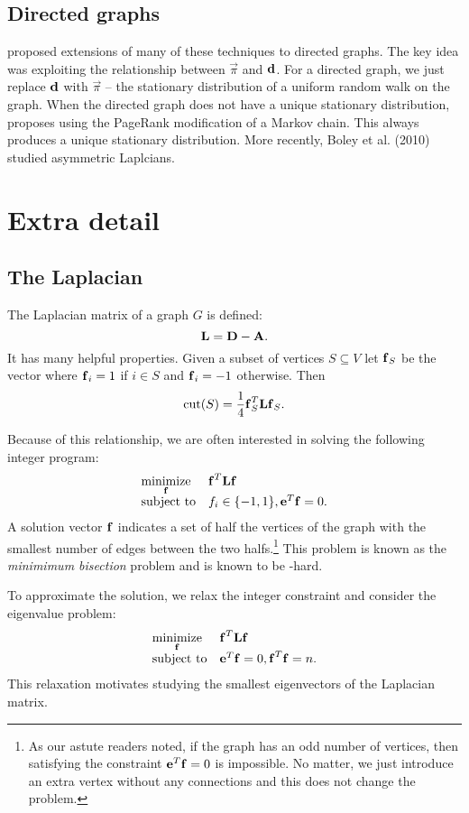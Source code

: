 \documentclass[nofonts]{dgleich-article}
\DeclareMathOperator{\cut}{cut}
\renewcommand{\vpi}{\vec{\pi}}
\begin{document}
\subsection{Directed graphs}

\citet{Chung2005-directed-laplacian} proposed extensions of many of these 
techniques to directed graphs.  
The key idea was exploiting the relationship between $\vpi$ and $\boldsymbol{\mathrm{d}}$.
For a directed graph, we just replace $\boldsymbol{\mathrm{d}}$ with $\vpi$ -- the stationary 
distribution of a uniform random walk on the graph.
When the directed graph does not have a unique stationary distribution,
\citet{zhou2005-directed-learning} proposes using the PageRank
modification of a Markov chain.  This always produces a unique stationary
distribution.  More recently, Boley et al. (2010)
studied asymmetric Laplcians.  

\section{Extra detail}

\subsection{The Laplacian}

The Laplacian matrix of a graph $G$ is defined:
\[ \boldsymbol{\mathrm{L}} = \boldsymbol{\mathrm{D}} - \boldsymbol{\mathrm{A}}. \]
It has many helpful properties.  Given a subset of vertices $S \subseteq V$
let  $\boldsymbol{\mathrm{f}}_S$ be the vector where $\boldsymbol{\mathrm{f}}_i = 1$ if $i \in S$ and $\boldsymbol{\mathrm{f}}_i = -1$
otherwise.  Then 
\[ \cut(S) = \frac{1}{4} \vf_S^T \mL \vf_S. \]


Because of this relationship, we are often interested in solving the following
integer program:
\[ \begin{array}{ll} {\displaystyle \operatorname*{minimize}_{\ensuremath{\boldsymbol{\mathrm{f}}}}} & \boldsymbol{\mathrm{f}}^T \boldsymbol{\mathrm{L}} \boldsymbol{\mathrm{f}} \\ \text{subject to} & f_i \in \{-1, 1\}, \boldsymbol{\mathrm{e}}^T \boldsymbol{\mathrm{f}} = 0.  \end{array}  \]
A solution vector $\boldsymbol{\mathrm{f}}$ indicates a set of half the vertices of the
graph with the smallest number of edges between the two halfs.\footnote{
As our astute readers noted, if the graph has an odd number of vertices,
then satisfying the constraint $\boldsymbol{\mathrm{e}}^T \boldsymbol{\mathrm{f}} = 0$ is impossible.  No matter,
we just introduce an extra vertex without any connections and this does not 
change the problem.}  This problem is known as the \emph{minimimum bisection}
problem and is known to be -hard.

To approximate the solution, we relax the integer constraint and consider
the eigenvalue problem: 
\[ \begin{array}{ll} {\displaystyle \operatorname*{minimize}_{\ensuremath{\boldsymbol{\mathrm{f}}}}} & \boldsymbol{\mathrm{f}}^T \boldsymbol{\mathrm{L}} \boldsymbol{\mathrm{f}} \\ \text{subject to} & \boldsymbol{\mathrm{e}}^T \boldsymbol{\mathrm{f}} = 0, \boldsymbol{\mathrm{f}}^T \boldsymbol{\mathrm{f}} = n. \end{array} \]
This relaxation motivates studying the smallest eigenvectors of
the Laplacian matrix.
\end{document}
